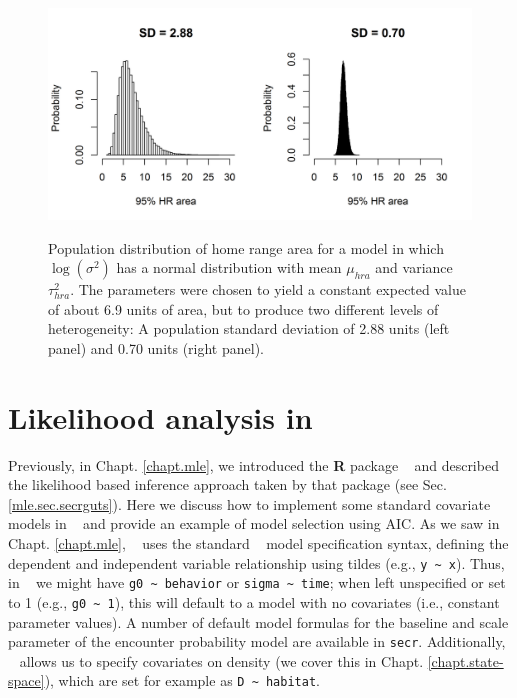 \begin{figure}[ht]
\begin{center}
\includegraphics[height=2.5in,width=5in]{Ch8-Covariates/figs/area_heterogeneity.png}
\end{center}
\caption{
Population distribution of home range area for a model in which
$\log(\sigma^{2})$ has a normal distribution with mean $\mu_{hra}$ and
variance $\tau^{2}_{hra}$. The parameters were chosen to yield a
constant expected value of about 6.9 units of area, but to produce two
different levels of heterogeneity: A population standard deviation of
2.88 units (left panel) and 0.70 units (right panel). 
}
\label{covariates.fig.one}
\end{figure}


















\section{Likelihood analysis in \secr}
\label{likelihood.secr}

Previously, in Chapt. \ref{chapt.mle}, we introduced the {\bf R}
package \secr~ and described the likelihood based inference approach taken
by that package (see Sec. \ref{mle.sec.secrguts}).  Here we discuss how
to implement some standard covariate models in \secr~ and provide an
example of model selection using AIC.   As we saw in
Chapt. \ref{chapt.mle}, \secr~ uses the standard \R~ model
specification syntax, defining the dependent and independent
variable relationship using tildes (e.g., \Verb+y ~ x+).  Thus, in
\secr~ we might have \verb+g0 ~ behavior+ or
\verb+sigma ~ time+; when left unspecified or set to 1 (e.g.,
\verb+g0 ~ 1+), this will default to a model with no covariates (i.e.,
constant parameter values).  A number of default model formulas for
the baseline and scale parameter of the encounter probability model
are available in \mbox{\tt secr}.
Additionally, \secr~ allows us to specify
covariates on density (we cover this in
Chapt. \ref{chapt.state-space}), which are set for
example as \verb+D ~ habitat+.

